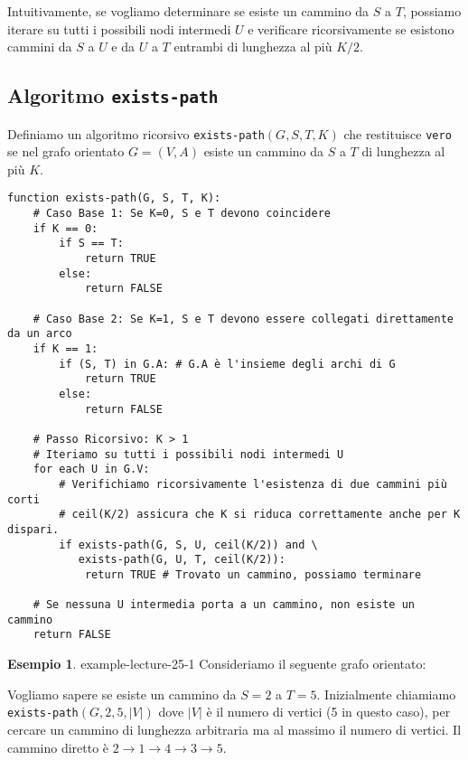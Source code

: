 \documentclass[a4paper]{article}
\theoremstyle{definition} %
\newtheorem{example}{Esempio}
\begin{document}
Intuitivamente, se vogliamo determinare se esiste un cammino da $S$ a $T$, possiamo iterare su tutti i possibili nodi intermedi $U$ e verificare ricorsivamente se esistono cammini da $S$ a $U$ e da $U$ a $T$ entrambi di lunghezza al più $K/2$.

\subsection{Algoritmo \texttt{exists-path}}
Definiamo un algoritmo ricorsivo \texttt{exists-path}$(G, S, T, K)$ che restituisce \texttt{vero} se nel grafo orientato $G=(V,A)$ esiste un cammino da $S$ a $T$ di lunghezza al più $K$.

\begin{verbatim}
function exists-path(G, S, T, K):
    # Caso Base 1: Se K=0, S e T devono coincidere
    if K == 0:
        if S == T:
            return TRUE
        else:
            return FALSE

    # Caso Base 2: Se K=1, S e T devono essere collegati direttamente da un arco
    if K == 1:
        if (S, T) in G.A: # G.A è l'insieme degli archi di G
            return TRUE
        else:
            return FALSE
    
    # Passo Ricorsivo: K > 1
    # Iteriamo su tutti i possibili nodi intermedi U
    for each U in G.V:
        # Verifichiamo ricorsivamente l'esistenza di due cammini più corti
        # ceil(K/2) assicura che K si riduca correttamente anche per K dispari.
        if exists-path(G, S, U, ceil(K/2)) and \
           exists-path(G, U, T, ceil(K/2)):
            return TRUE # Trovato un cammino, possiamo terminare
            
    # Se nessuna U intermedia porta a un cammino, non esiste un cammino
    return FALSE
\end{verbatim}

\begin{example}{}{{ example-lecture-25-1 }}
Consideriamo il seguente grafo orientato:
\begin{center}
\end{center}
Vogliamo sapere se esiste un cammino da $S=2$ a $T=5$. Inizialmente chiamiamo \texttt{exists-path}$(G, 2, 5, |V|)$ dove $|V|$ è il numero di vertici (5 in questo caso), per cercare un cammino di lunghezza arbitraria ma al massimo il numero di vertici.
Il cammino diretto è $2 \to 1 \to 4 \to 3 \to 5$.
\end{example}
\end{document}
